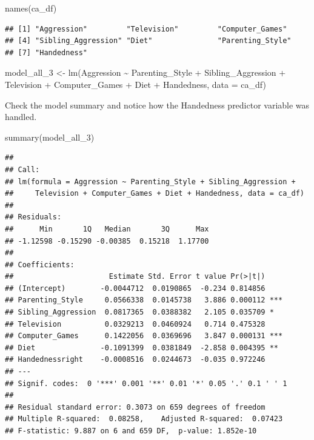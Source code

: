 \documentclass[
]{book}
\newenvironment{Shaded}{\begin{snugshade}}{\end{snugshade}}
\newcommand{\AttributeTok}[1]{\textcolor[rgb]{0.77,0.63,0.00}{#1}}
\newcommand{\FunctionTok}[1]{\textcolor[rgb]{0.00,0.00,0.00}{#1}}
\newcommand{\NormalTok}[1]{#1}
\newcommand{\OtherTok}[1]{\textcolor[rgb]{0.56,0.35,0.01}{#1}}
\newcommand{\SpecialCharTok}[1]{\textcolor[rgb]{0.00,0.00,0.00}{#1}}
\begin{document}
\begin{Shaded}
\begin{Highlighting}[]
\FunctionTok{names}\NormalTok{(ca\_df)}
\end{Highlighting}
\end{Shaded}

\begin{verbatim}
## [1] "Aggression"         "Television"         "Computer_Games"    
## [4] "Sibling_Aggression" "Diet"               "Parenting_Style"   
## [7] "Handedness"
\end{verbatim}

\begin{Shaded}
\begin{Highlighting}[]
\NormalTok{model\_all\_3 }\OtherTok{\textless{}{-}} \FunctionTok{lm}\NormalTok{(Aggression }\SpecialCharTok{\textasciitilde{}}\NormalTok{ Parenting\_Style }\SpecialCharTok{+}\NormalTok{ Sibling\_Aggression }\SpecialCharTok{+}\NormalTok{ Television }\SpecialCharTok{+}\NormalTok{ Computer\_Games }\SpecialCharTok{+}\NormalTok{ Diet }\SpecialCharTok{+}\NormalTok{ Handedness, }\AttributeTok{data =}\NormalTok{ ca\_df)}
\end{Highlighting}
\end{Shaded}

Check the model summary and notice how the Handedness predictor variable was handled.

\begin{Shaded}
\begin{Highlighting}[]
\FunctionTok{summary}\NormalTok{(model\_all\_3)}
\end{Highlighting}
\end{Shaded}

\begin{verbatim}
## 
## Call:
## lm(formula = Aggression ~ Parenting_Style + Sibling_Aggression + 
##     Television + Computer_Games + Diet + Handedness, data = ca_df)
## 
## Residuals:
##      Min       1Q   Median       3Q      Max 
## -1.12598 -0.15290 -0.00385  0.15218  1.17700 
## 
## Coefficients:
##                      Estimate Std. Error t value Pr(>|t|)    
## (Intercept)        -0.0044712  0.0190865  -0.234 0.814856    
## Parenting_Style     0.0566338  0.0145738   3.886 0.000112 ***
## Sibling_Aggression  0.0817365  0.0388382   2.105 0.035709 *  
## Television          0.0329213  0.0460924   0.714 0.475328    
## Computer_Games      0.1422056  0.0369696   3.847 0.000131 ***
## Diet               -0.1091399  0.0381849  -2.858 0.004395 ** 
## Handednessright    -0.0008516  0.0244673  -0.035 0.972246    
## ---
## Signif. codes:  0 '***' 0.001 '**' 0.01 '*' 0.05 '.' 0.1 ' ' 1
## 
## Residual standard error: 0.3073 on 659 degrees of freedom
## Multiple R-squared:  0.08258,    Adjusted R-squared:  0.07423 
## F-statistic: 9.887 on 6 and 659 DF,  p-value: 1.852e-10
\end{verbatim}
\end{document}
